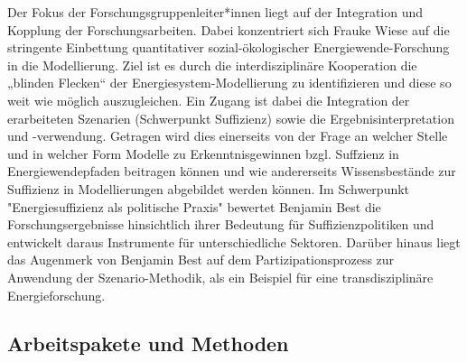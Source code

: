 \documentclass[a4paper,11pt,twoside]{scrartcl}
\begin{document}
Der Fokus der Forschungsgruppenleiter*innen liegt auf der Integration und Kopplung der Forschungsarbeiten. Dabei konzentriert sich Frauke Wiese auf die stringente Einbettung quantitativer sozial-ökologischer Energiewende-Forschung in die Modellierung. Ziel ist es durch die interdisziplinäre Kooperation die „blinden Flecken“ der Energiesystem-Modellierung zu identifizieren und diese so weit wie möglich auszugleichen. Ein Zugang ist dabei die Integration der erarbeiteten Szenarien (Schwerpunkt Suffizienz) sowie die Ergebnisinterpretation und -verwendung. Getragen wird dies einerseits von der Frage an welcher Stelle und in welcher Form Modelle zu Erkenntnisgewinnen bzgl. Suffzienz in Energiewendepfaden beitragen können und wie andererseits Wissensbestände zur Suffizienz in Modellierungen abgebildet werden können. Im Schwerpunkt "Energiesuffizienz als politische Praxis" bewertet Benjamin Best die Forschungsergebnisse hinsichtlich ihrer Bedeutung für Suffizienzpolitiken und entwickelt daraus Instrumente für unterschiedliche Sektoren. Darüber hinaus liegt das Augenmerk von Benjamin Best auf dem Partizipationsprozess zur Anwendung der Szenario-Methodik, als ein Beispiel für eine transdisziplinäre Energieforschung. 


\subsection{Arbeitspakete und Methoden}
\end{document}
